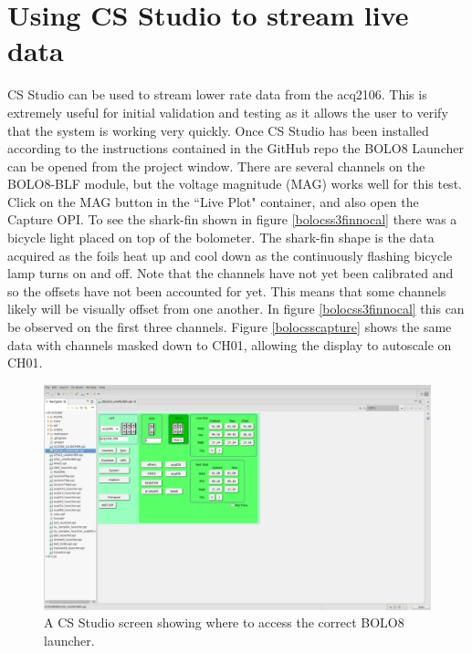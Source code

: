 \documentclass{article}
\begin{document}
\section{Using CS Studio to stream live data}
CS Studio can be used to stream lower rate data from the acq2106.
This is extremely useful for initial validation and testing as it allows the user to verify that the system is working very quickly.
Once CS Studio has been installed according to the instructions contained in the GitHub repo the BOLO8 Launcher can be opened from the project window.
There are several channels on the BOLO8-BLF module, but the voltage magnitude (MAG) works well for this test.
Click on the MAG button in the ``Live Plot" container, and also open the Capture OPI.
To see the shark-fin shown in figure \ref{bolocss3finnocal} there was a bicycle light placed on top of the bolometer.
The shark-fin shape is the data acquired as the foils heat up and cool down as the continuously flashing bicycle lamp turns on and off.
Note that the channels have not yet been calibrated and so the offsets have not been accounted for yet.
This means that some channels likely will be visually offset from one another.
In figure \ref{bolocss3finnocal} this can be observed on the first three channels.
Figure \ref{bolocsscapture} shows the same data with channels masked down to CH01, allowing the display to autoscale on CH01.

\begin{figure} [hbt!]
	\centering
	\includegraphics[width=5.0in]{images/css_launcher.png}
	\caption{A CS Studio screen showing where to access the correct BOLO8 launcher.}
	\label{bolocsslauncher}
\end{figure}
\end{document}
